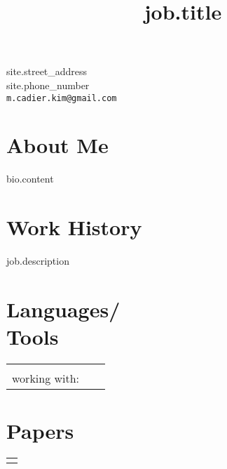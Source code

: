 \documentclass[margin,line,pifont,palatino,courier]{res}
\newenvironment{list1}{
  \begin{list}{\label{ } }{
      \setlength{\itemsep}{0in}
      \setlength{\parsep}{0in} \setlength{\parskip}{0in}
      \setlength{\topsep}{0in} \setlength{\partopsep}{0in}
      \setlength{\leftmargin}{0.0in} } }{\end{list} }
\begin{document}


\begin{resume}




\begin{flushright}
{\small
{{site.street_address}} \\
{{site.phone_number}}\\
  \verb+m.cadier.kim@gmail.com+
}
\end{flushright}
 
\section{\sc  About Me}
    {%
      {%
          {%
            {{ bio.content }}
          {%
      {%


\section{\sc  Work History}
  {%
  {%
    \title{ {{job.title}}  }

    \begin{position}
    {{ job.description }}
    \end{position}
  {%

\section{\sc Languages/ \\ Tools}

  \begin{tabular}{@{}p{6in}p{3in}}

    {%
    \\working with: \ 
    {%

  \end{tabular}


\section{\sc Papers}
  \begin{tabular}{@{}p{5in}}
    \begin{list1}
      {%
      {%
        {%
            \item {\em {{paper.title}}}, {%
        {%
      \vspace{.2em}
      {%
    \end{list1}
  \end{tabular}


}}}}}}}}
\end{resume}
\end{document}
